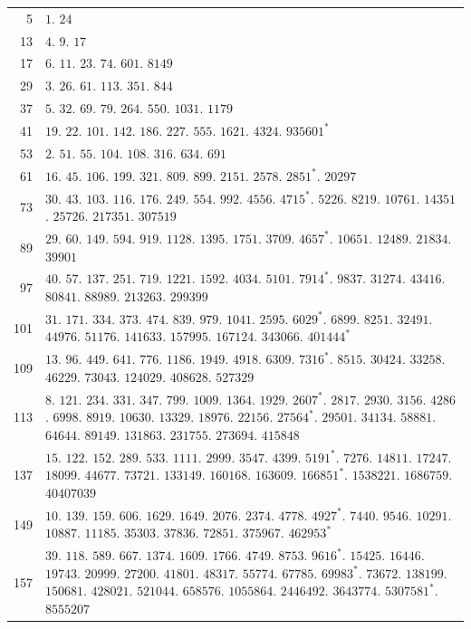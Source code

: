 \begin{longtable}{@{}r|p{\dimexpr\linewidth-38pt\relax}@{}}
5 & $1$. $24$\\
13 & $4$. $9$. $17$\\
17 & $6$. $11$. $23$. $74$. $601$. $8149$\\
29 & $3$. $26$. $61$. $113$. $351$. $844$\\
37 & $5$. $32$. $69$. $79$. $264$. $550$. $1031$. $1179$\\
41 & $19$. $22$. $101$. $142$. $186$. $227$. $555$. $1621$. $4324$. $935601^{*}$\\
53 & $2$. $51$. $55$. $104$. $108$. $316$. $634$. $691$\\
61 & $16$. $45$. $106$. $199$. $321$. $809$. $899$. $2151$. $2578$. $2851^{*}$. $20297$\\
73 & $30$. $43$. $103$. $116$. $176$. $249$. $554$. $992$. $4556$. $4715^{*}$. $5226$. $8219$. $10761$. $14351$. $25726$. $217351$. $307519$\\
89 & $29$. $60$. $149$. $594$. $919$. $1128$. $1395$. $1751$. $3709$. $4657^{*}$. $10651$. $12489$. $21834$. $39901$\\
97 & $40$. $57$. $137$. $251$. $719$. $1221$. $1592$. $4034$. $5101$. $7914^{*}$. $9837$. $31274$. $43416$. $80841$. $88989$. $213263$. $299399$\\
101 & $31$. $171$. $334$. $373$. $474$. $839$. $979$. $1041$. $2595$. $6029^{*}$. $6899$. $8251$. $32491$. $44976$. $51176$. $141633$. $157995$. $167124$. $343066$. $401444^{*}$\\
109 & $13$. $96$. $449$. $641$. $776$. $1186$. $1949$. $4918$. $6309$. $7316^{*}$. $8515$. $30424$. $33258$. $46229$. $73043$. $124029$. $408628$. $527329$\\
113 & $8$. $121$. $234$. $331$. $347$. $799$. $1009$. $1364$. $1929$. $2607^{*}$. $2817$. $2930$. $3156$. $4286$. $6998$. $8919$. $10630$. $13329$. $18976$. $22156$. $27564^{*}$. $29501$. $34134$. $58881$. $64644$. $89149$. $131863$. $231755$. $273694$. $415848$\\
137 & $15$. $122$. $152$. $289$. $533$. $1111$. $2999$. $3547$. $4399$. $5191^{*}$. $7276$. $14811$. $17247$. $18099$. $44677$. $73721$. $133149$. $160168$. $163609$. $166851^{*}$. $1538221$. $1686759$. $40407039$\\
149 & $10$. $139$. $159$. $606$. $1629$. $1649$. $2076$. $2374$. $4778$. $4927^{*}$. $7440$. $9546$. $10291$. $10887$. $11185$. $35303$. $37836$. $72851$. $375967$. $462953^{*}$\\
157 & $39$. $118$. $589$. $667$. $1374$. $1609$. $1766$. $4749$. $8753$. $9616^{*}$. $15425$. $16446$. $19743$. $20999$. $27200$. $41801$. $48317$. $55774$. $67785$. $69983^{*}$. $73672$. $138199$. $150681$. $428021$. $521044$. $658576$. $1055864$. $2446492$. $3643774$. $5307581^{*}$. $8555207$\\

\end{longtable}

